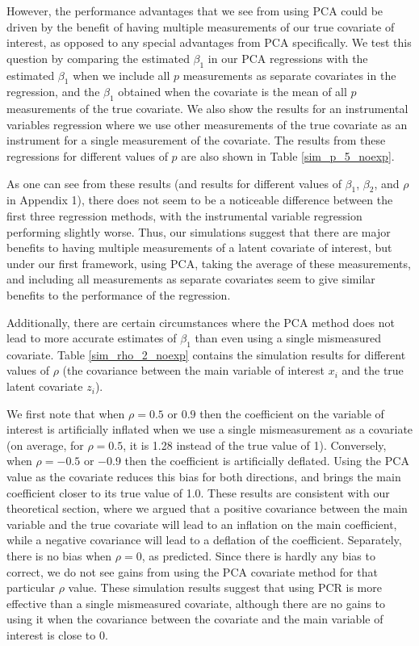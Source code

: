 \documentclass[10pt]{article}
\begin{document}
However, the performance advantages that we see from using PCA could be driven by the benefit of having multiple measurements of our true covariate of interest, as opposed to any special advantages from PCA specifically. We test this question by comparing the estimated $\beta_1$ in our PCA regressions with the estimated $\beta_1$ when we include all $p$ measurements as separate covariates in the regression, and the $\beta_1$ obtained when the covariate is the mean of all $p$ measurements of the true covariate. We also show the results for an instrumental variables regression where we use other measurements of the true covariate as an instrument for a single measurement of the covariate. The results from these regressions for different values of $p$ are also shown in Table \ref{sim_p_5_noexp}.

As one can see from these results (and results for different values of $\beta_1$, $\beta_2$, and $\rho$ in Appendix 1), there does not seem to be a noticeable difference between the first three regression methods, with the instrumental variable regression performing slightly worse. Thus, our simulations suggest that there are major benefits to having multiple measurements of a latent covariate of interest, but under our first framework, using PCA, taking the average of these measurements, and including all measurements as separate covariates seem to give similar benefits to the performance of the regression.

Additionally, there are certain circumstances where the PCA method does not lead to more accurate estimates of $\beta_1$ than even using a single mismeasured covariate. Table \ref{sim_rho_2_noexp} contains the simulation results for different values of $\rho$ (the covariance between the main variable of interest $x_i$ and the true latent covariate $z_i$).



We first note that when $\rho = 0.5$ or $0.9$ then the coefficient on the variable of interest is artificially inflated when we use a single mismeasurement as a covariate (on average, for $\rho = 0.5$, it is 1.28 instead of the true value of 1). Conversely, when $\rho = -0.5$ or $-0.9$ then the coefficient is artificially deflated. Using the PCA value as the covariate reduces this bias for both directions, and brings the main coefficient closer to its true value of 1.0. These results are consistent with our theoretical section, where we argued that a positive covariance between the main variable and the true covariate will lead to an inflation on the main coefficient, while a negative covariance will lead to a deflation of the coefficient. Separately, there is no bias when $\rho = 0$, as predicted. Since there is hardly any bias to correct, we do not see gains from using the PCA covariate method for that particular $\rho$ value. These simulation results suggest that using PCR is more effective than a single mismeasured covariate, although there are no gains to using it when the covariance between the covariate and the main variable of interest is close to $0$.
\end{document}
